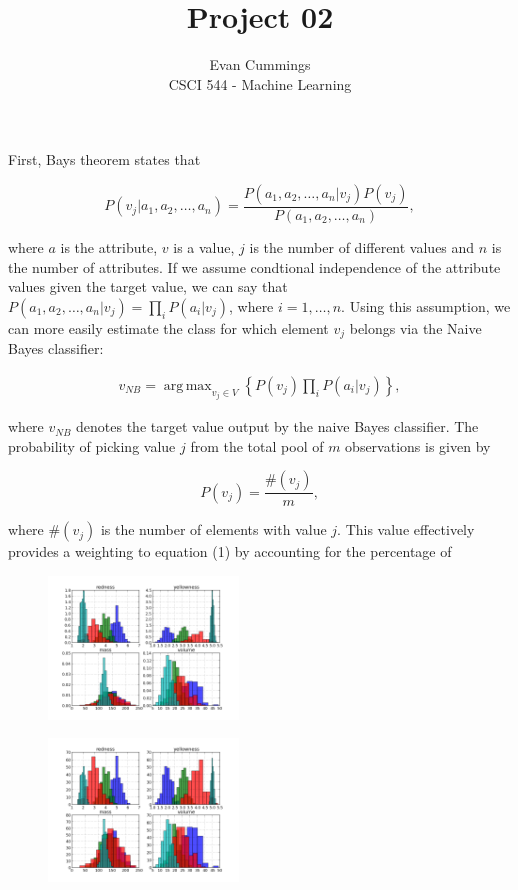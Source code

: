 
\DeclareMathOperator*{\argmax}{arg\,max}


\small

\title{Project 02}
\author{Evan Cummings\\
CSCI 544 - Machine Learning}

\maketitle

First, Bays theorem states that

$$ P(v_j | a_1, a_2, \ldots, a_n) = \frac{P(a_1, a_2, \ldots, a_n | v_j) P(v_j)}{P(a_1,a_2,\ldots,a_n)},$$

where $a$ is the attribute, $v$ is a value, $j$ is the number of different values and $n$ is the number of attributes.  If we assume condtional independence of the attribute values given the target value, we can say that $P(a_1, a_2, \ldots, a_n | v_j) = \prod_i P(a_i | v_j)$, where $i = 1,\ldots,n$.  Using this assumption, we can more easily estimate the class for which element $v_j$ belongs via the Naive Bayes classifier:

\begin{align}
  v_{NB} = \argmax_{v_j \in V}\left\{ P(v_j) \prod_i P(a_i | v_j) \right\},
\end{align}

where $v_{NB}$ denotes the target value output by the naive Bayes classifier.  The probability of picking value $j$ from the total pool of $m$ observations is given by

$$ P(v_j) = \frac{\#(v_j)}{m},$$

where $\#(v_j)$ is the number of elements with value $j$.  This value effectively provides a weighting to equation (1) by accounting for the percentage of 

\begin{multicols}{2}
\begin{figure}[H]
  \centering
		\includegraphics[width=0.45\textwidth]{images/normed.png}
\end{figure}
\vspace{5mm}

\begin{figure}[H]
  \centering
		\includegraphics[width=0.45\textwidth]{images/not_normed.png}
\end{figure}
\vspace{5mm}
\end{multicols}





